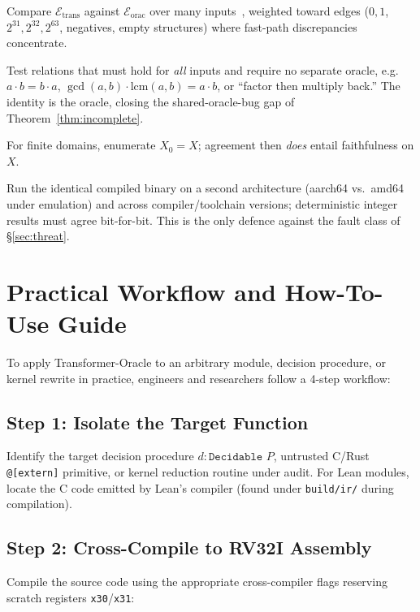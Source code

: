 \documentclass[11pt]{article}
\theoremstyle{definition}
\theoremstyle{plain}
\theoremstyle{remark}
\newcommand{\eval}{\mathcal{E}}
\begin{document}
\begin{description}[leftmargin=1.2em,itemsep=1pt]
\item[Differential.] Compare $\eval_{\mathrm{trans}}$ against $\eval_{\mathrm{orac}}$ over many inputs~\cite{mckeeman1998,yang2011},
      weighted toward edges ($0,1$, $2^{31},2^{32},2^{63}$, negatives, empty structures) where fast-path
      discrepancies concentrate.
\item[Metamorphic~\cite{chen1998}.] Test relations that must hold for \emph{all} inputs and require no separate oracle,
      e.g.\ $a\cdot b = b\cdot a$, $\gcd(a,b)\cdot\mathrm{lcm}(a,b)=a\cdot b$, or ``factor then multiply
      back.'' The identity is the oracle, closing the shared-oracle-bug gap of Theorem~\ref{thm:incomplete}.
\item[Bounded-exhaustive.] For finite domains, enumerate $X_0=X$; agreement then \emph{does} entail
      faithfulness on $X$.
\item[Redundant execution.] Run the identical compiled binary on a second architecture (aarch64 vs.\
      amd64 under emulation) and across compiler/toolchain versions; deterministic integer results must
      agree bit-for-bit. This is the only defence against the fault class of \S\ref{sec:threat}.
\end{description}

\section{Practical Workflow and How-To-Use Guide}\label{sec:workflow}

To apply Transformer-Oracle to an arbitrary module, decision procedure, or kernel rewrite in practice, engineers and researchers follow a 4-step workflow:

\subsection{Step 1: Isolate the Target Function}
Identify the target decision procedure $d : \texttt{Decidable } P$, untrusted C/Rust \texttt{@[extern]} primitive, or kernel reduction routine under audit. For Lean modules, locate the C code emitted by Lean's compiler (found under \texttt{build/ir/} during compilation).

\subsection{Step 2: Cross-Compile to RV32I Assembly}
Compile the source code using the appropriate cross-compiler flags reserving scratch registers \texttt{x30}/\texttt{x31}:
\end{document}
